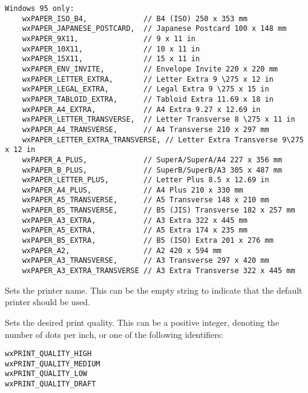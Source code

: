 {\begin{verbatim}
Windows 95 only:
    wxPAPER_ISO_B4,             // B4 (ISO) 250 x 353 mm
    wxPAPER_JAPANESE_POSTCARD,  // Japanese Postcard 100 x 148 mm
    wxPAPER_9X11,               // 9 x 11 in
    wxPAPER_10X11,              // 10 x 11 in
    wxPAPER_15X11,              // 15 x 11 in
    wxPAPER_ENV_INVITE,         // Envelope Invite 220 x 220 mm
    wxPAPER_LETTER_EXTRA,       // Letter Extra 9 \275 x 12 in
    wxPAPER_LEGAL_EXTRA,        // Legal Extra 9 \275 x 15 in
    wxPAPER_TABLOID_EXTRA,      // Tabloid Extra 11.69 x 18 in
    wxPAPER_A4_EXTRA,           // A4 Extra 9.27 x 12.69 in
    wxPAPER_LETTER_TRANSVERSE,  // Letter Transverse 8 \275 x 11 in
    wxPAPER_A4_TRANSVERSE,      // A4 Transverse 210 x 297 mm
    wxPAPER_LETTER_EXTRA_TRANSVERSE, // Letter Extra Transverse 9\275 x 12 in
    wxPAPER_A_PLUS,             // SuperA/SuperA/A4 227 x 356 mm
    wxPAPER_B_PLUS,             // SuperB/SuperB/A3 305 x 487 mm
    wxPAPER_LETTER_PLUS,        // Letter Plus 8.5 x 12.69 in
    wxPAPER_A4_PLUS,            // A4 Plus 210 x 330 mm
    wxPAPER_A5_TRANSVERSE,      // A5 Transverse 148 x 210 mm
    wxPAPER_B5_TRANSVERSE,      // B5 (JIS) Transverse 182 x 257 mm
    wxPAPER_A3_EXTRA,           // A3 Extra 322 x 445 mm
    wxPAPER_A5_EXTRA,           // A5 Extra 174 x 235 mm
    wxPAPER_B5_EXTRA,           // B5 (ISO) Extra 201 x 276 mm
    wxPAPER_A2,                 // A2 420 x 594 mm
    wxPAPER_A3_TRANSVERSE,      // A3 Transverse 297 x 420 mm
    wxPAPER_A3_EXTRA_TRANSVERSE // A3 Extra Transverse 322 x 445 mm
\end{verbatim}
}

\label{wxprintdatasetprintername}


Sets the printer name. This can be the empty string to indicate that the default
printer should be used.

\label{wxprintdatasetquality}


Sets the desired print quality. This can be a positive integer, denoting the number of dots per inch, or
one of the following identifiers:

\begin{verbatim}
wxPRINT_QUALITY_HIGH
wxPRINT_QUALITY_MEDIUM
wxPRINT_QUALITY_LOW
wxPRINT_QUALITY_DRAFT
\end{verbatim}

